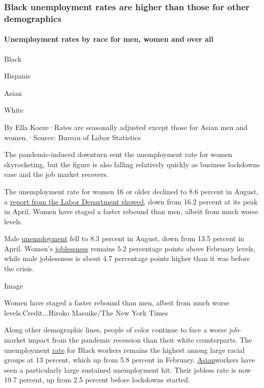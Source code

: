 \hypertarget{black-unemployment-rates-are-higher-than-those-for-other-demographics}{%
\subsubsection{Black unemployment rates are higher than those for other
demographics}\label{black-unemployment-rates-are-higher-than-those-for-other-demographics}}

\hypertarget{unemployment-rates-by-race-for-men-women-and-over-all}{%
\paragraph{Unemployment rates by race for men, women and over
all}\label{unemployment-rates-by-race-for-men-women-and-over-all}}

Black

Hispanic

Asian

White

By Ella Koeze·Rates are seasonally adjusted except those for Asian men
and women.·Source: Bureau of Labor Statistics

The pandemic-induced downturn sent the unemployment rate for women
skyrocketing, but the figure is also falling relatively quickly as
business lockdowns ease and the job market recovers.

The unemployment rate for women 16 or older declined to 8.6 percent in
August, a \href{https://www.bls.gov/news.release/empsit.t01.htm}{report
from the Labor Department showed}, down from 16.2 percent at its peak in
April. Women have staged a faster rebound than men, albeit from much
worse levels.

Male
\href{https://beta.bls.gov/dataViewer/view/timeseries/LNS14000001}{unemployment}
fell to 8.3 percent in August, down from 13.5 percent in April. Women's
\href{https://beta.bls.gov/dataViewer/view/timeseries/LNS14000002}{joblessness}
remains 5.2 percentage points above February levels, while male
joblessness is about 4.7 percentage points higher than it was before the
crisis.

Image

Women have staged a faster rebound than men, albeit from much worse
levels.Credit...Hiroko Masuike/The New York Times

Along other demographic lines, people of color continue to face a worse
job-market impact from the pandemic recession than their white
counterparts. The unemployment
\href{https://beta.bls.gov/dataViewer/view/timeseries/LNS14000006}{rate}
for Black workers remains the highest among large racial groups at 13
percent, which up from 5.8 percent in February.
\href{https://beta.bls.gov/dataViewer/view/timeseries/LNS14032183}{Asian}workers
have seen a particularly large sustained unemployment hit: Their jobless
rate is now 10.7 percent, up from 2.5 percent before lockdowns started.

